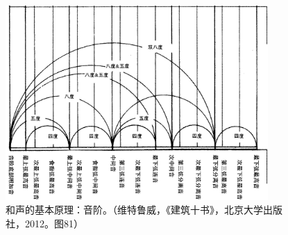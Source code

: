 \begin{enumerate}
\begin{figure}[htbp]
\begin{center}
\includegraphics[width=10cm]{Preface/manyoctaves.png}
\caption{和声的基本原理：音阶。（维特鲁威，《建筑十书》，北京大学出版社，2012。图81）}
\end{center}
\end{figure}


\end{enumerate}
